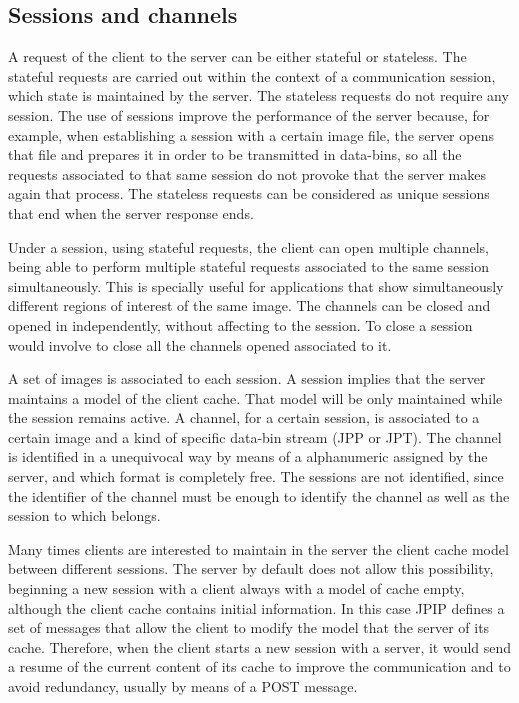 \subsection{Sessions and channels}

A request of the client to the server can be either stateful or stateless.
The stateful requests are carried out within the context of a 
communication session, which state is maintained by the server.
The stateless requests do not require any session. The use of 
sessions improve the performance of the server because, for example,
when establishing a session with a certain image file, the server
opens that file and prepares it in order to be transmitted in
data-bins, so all the requests associated to that same session
do not provoke that the server makes again that process. The stateless
requests can be considered as unique sessions that end when the
server response ends.

Under a session, using stateful requests, the client can open
multiple channels, being able to perform multiple stateful
requests associated to the same session simultaneously. This
is specially useful for applications that show simultaneously
different regions of interest of the same image. The channels
can be closed and opened in independently, without affecting
to the session. To close a session would involve to close all
the channels opened associated to it.

A set of images is associated to each session. A session
implies that the server maintains a model of the client
cache. That model will be only maintained while
the session remains active. A channel, for a certain session,
is associated to a certain image and a kind of specific
data-bin stream (JPP or JPT). The channel is identified
in a unequivocal way by means of a alphanumeric assigned
by the server, and which format is completely free. The sessions
are not identified, since the identifier of the channel
must be enough to identify the channel as well as the session
to which belongs.

Many times clients are interested to maintain in the server
the client cache model between different sessions. The server
by default does not allow this possibility, beginning a new
session with a client always with a model of cache empty, although
the client cache contains initial information. In this case JPIP
defines a set of messages that allow the client to modify the model 
that the server of its cache. Therefore, when the client starts
a new session with a server, it would send a resume of the current
content of its cache to improve the communication and to avoid
redundancy, usually by means of a POST message.

